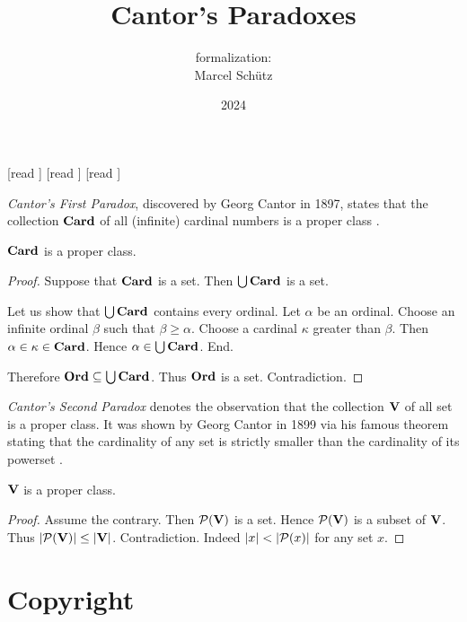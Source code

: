 \documentclass{article}
\title{Cantor's Paradoxes}
\author{\Naproche formalization: \\[0.5em]Marcel Schütz}
\date{2024}
\begin{document}
  \maketitle

  \begin{imports}
    \begin{forthel}
      [read ]
      [read ]
      [read ]
    \end{forthel}
  \end{imports}

  \noindent \emph{Cantor's First Paradox}, discovered by Georg Cantor in 1897,
  states that the collection $\textbf{Card}$ of all (infinite) cardinal numbers is a
  proper class \cite[chapter 156]{Cantor1991}.

  \begin{forthel}
    \begin{theorem*}[title=Cantor's First Paradox,id=cantor_paradox_1]
      $\textbf{Card}$ is a proper class.
    \end{theorem*}
    \begin{proof}
      Suppose that $\textbf{Card}$ is a set.
      Then $\bigcup \textbf{Card}$ is a set.

      Let us show that $\bigcup \textbf{Card}$ contains every ordinal.
        Let $\alpha$ be an ordinal.
        Choose an infinite ordinal $\beta$ such that $\beta \geq \alpha$.
        Choose a cardinal $\kappa$ greater than $\beta$.
        Then $\alpha \in \kappa \in \textbf{Card}$.
        Hence $\alpha \in \bigcup \textbf{Card}$.
      End.

      Therefore $\textbf{Ord} \subseteq \bigcup \textbf{Card}$.
      Thus $\textbf{Ord}$ is a set.
      Contradiction.
    \end{proof}
  \end{forthel}

  \emph{Cantor's Second Paradox} denotes the observation that the collection
  $\textbf{V}$ of all set is a proper class.
  It was shown by Georg Cantor in 1899 via his famous theorem stating that the
  cardinality of any set is strictly smaller than the cardinality of its 
  powerset \cite[chapter 163]{Cantor1991}.

  \begin{forthel}
    \begin{theorem*}[title=Cantor's Second Paradox,id=cantor_paradox_2]
      $\textbf{V}$ is a proper class.
    \end{theorem*}
    \begin{proof}
      Assume the contrary.
      Then $\mathcal{P}(\textbf{V})$ is a set.
      Hence $\mathcal{P}(\textbf{V})$ is a subset of $\textbf{V}$.
      Thus $|\mathcal{P}(\textbf{V})| \leq |\textbf{V}|$.
      Contradiction.
      Indeed $|x| < |\mathcal{P}(x)|$ for any set $x$.
    \end{proof}
  \end{forthel}

  \printbibliography

  \section*{Copyright}
  \doclicenseThis
\end{document}
